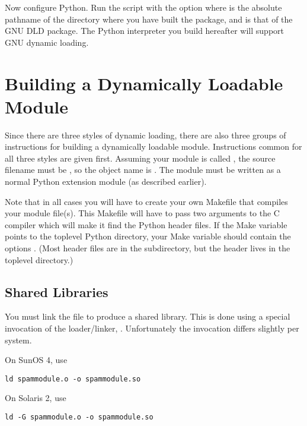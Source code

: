 \documentclass{manual}
\begin{document}
Now configure Python.  Run the  script with the option
 where
 is the absolute pathname of the directory where you
have built the  package, and  is that
of the GNU DLD package.  The Python interpreter you build hereafter
will support GNU dynamic loading.


\section{Building a Dynamically Loadable Module
         \label{makedynload}}

Since there are three styles of dynamic loading, there are also three
groups of instructions for building a dynamically loadable module.
Instructions common for all three styles are given first.  Assuming
your module is called , the source filename must be
, so the object name is .  The
module must be written as a normal Python extension module (as
described earlier).

Note that in all cases you will have to create your own Makefile that
compiles your module file(s).  This Makefile will have to pass two
 arguments to the C compiler which will make it find the
Python header files.  If the Make variable  points to
the toplevel Python directory, your  Make variable should
contain the options .
(Most header files are in the  subdirectory, but the
 header lives in the toplevel directory.)


\subsection{Shared Libraries
            \label{linking}}

You must link the  file to produce a shared library.  This is 
done using a special invocation of the \UNIX{} loader/linker,
.  Unfortunately the invocation differs slightly per
system.

On SunOS 4, use
\begin{verbatim}
ld spammodule.o -o spammodule.so
\end{verbatim}

On Solaris 2, use
\begin{verbatim}
ld -G spammodule.o -o spammodule.so
\end{verbatim}
\end{document}
